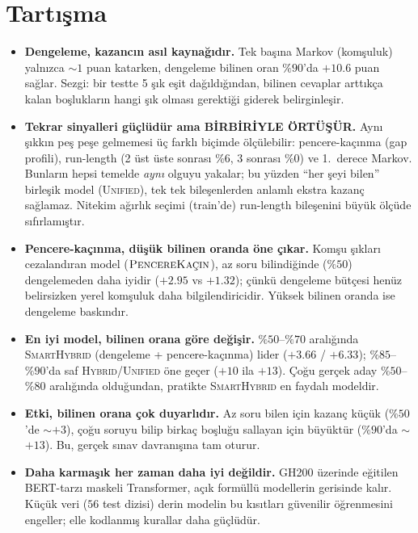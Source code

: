 \documentclass[11pt]{article}
\begin{document}
\section{Tartışma}
\begin{itemize}
  \item \textbf{Dengeleme, kazancın asıl kaynağıdır.} Tek başına Markov
  (komşuluk) yalnızca $\sim 1$ puan katarken, dengeleme bilinen oran
  $\%90$'da $+10.6$ puan sağlar. Sezgi: bir testte 5 şık eşit dağıldığından,
  bilinen cevaplar arttıkça kalan boşlukların hangi şık olması gerektiği
  giderek belirginleşir.
  \item \textbf{Tekrar sinyalleri güçlüdür ama BİRBİRİYLE ÖRTÜŞÜR.} Aynı
  şıkkın peş peşe gelmemesi üç farklı biçimde ölçülebilir: pencere-kaçınma
  (gap profili), run-length (2 üst üste sonrası $\%6$, 3 sonrası $\%0$) ve
  1.\ derece Markov. Bunların hepsi temelde \emph{aynı} olguyu yakalar; bu
  yüzden ``her şeyi bilen'' birleşik model (\textsc{Unified}), tek tek
  bileşenlerden anlamlı ekstra kazanç sağlamaz. Nitekim ağırlık seçimi
  (train'de) run-length bileşenini büyük ölçüde sıfırlamıştır.
  \item \textbf{Pencere-kaçınma, düşük bilinen oranda öne çıkar.} Komşu
  şıkları cezalandıran model ($\textsc{PencereKaçın}$), az soru bilindiğinde
  ($\%50$) dengelemeden daha iyidir ($+2.95$ vs $+1.32$); çünkü dengeleme
  bütçesi henüz belirsizken yerel komşuluk daha bilgilendiricidir. Yüksek
  bilinen oranda ise dengeleme baskındır.
  \item \textbf{En iyi model, bilinen orana göre değişir.} $\%50$--$\%70$
  aralığında \textsc{SmartHybrid} (dengeleme + pencere-kaçınma) lider
  ($+3.66$ / $+6.33$); $\%85$--$\%90$'da saf \textsc{Hybrid}/\textsc{Unified}
  öne geçer ($+10$ ila $+13$). Çoğu gerçek aday $\%50$--$\%80$ aralığında
  olduğundan, pratikte \textsc{SmartHybrid} en faydalı modeldir.
  \item \textbf{Etki, bilinen orana çok duyarlıdır.} Az soru bilen için kazanç
  küçük ($\%50$'de $\sim$$+3$), çoğu soruyu bilip birkaç boşluğu sallayan için
  büyüktür ($\%90$'da $\sim$$+13$). Bu, gerçek sınav davranışına tam oturur.
  \item \textbf{Daha karmaşık her zaman daha iyi değildir.} GH200 üzerinde
  eğitilen BERT-tarzı maskeli Transformer, açık formüllü modellerin gerisinde
  kalır. Küçük veri ($56$ test dizisi) derin modelin bu kısıtları güvenilir
  öğrenmesini engeller; elle kodlanmış kurallar daha güçlüdür.
\end{itemize}
\end{document}
